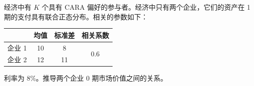 \par\noindent\begin{minipage}{\linewidth}
\begin{problem}
 经济中有 $K$ 个具有 CARA 偏好的参与者。经济中只有两个企业，它们的资产在 1 期的支付具有联合正态分布。相关的参数如下：
\begin{center}
\begin{tabular}{lccc}
    \toprule
     & 均值 & 标准差 & 相关系数 \\
    \midrule
    企业 1 & 10 & 8 & \multirow{2}{*}{0.6} \\
    企业 2 & 12 & 11 & \\
    \bottomrule
\end{tabular}
\end{center}
利率为 $8\%$。推导两个企业 0 期市场价值之间的关系。
\end{problem}
\end{minipage}\par
{}
